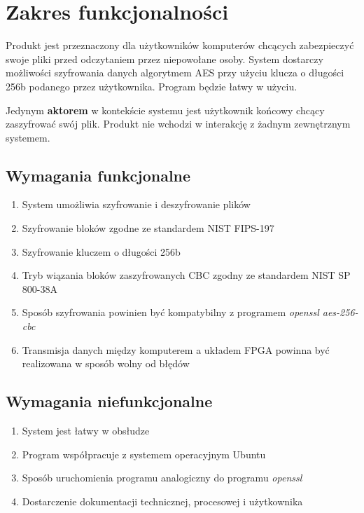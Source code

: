 \section{Zakres funkcjonalności}
\label{sec:zakres-funkcjonalnosci}

Produkt jest przeznaczony dla użytkowników komputerów chcących zabezpieczyć swoje pliki przed odczytaniem przez niepowołane osoby. System dostarczy możliwości szyfrowania danych algorytmem AES przy użyciu klucza o długości 256b podanego przez użytkownika. Program będzie łatwy w użyciu.

Jedynym \textbf{aktorem} w kontekście systemu jest użytkownik końcowy chcący zaszyfrować swój plik. Produkt nie wchodzi w interakcję z żadnym zewnętrznym systemem.

\subsection{Wymagania funkcjonalne}
\begin{enumerate}
\item System umożliwia szyfrowanie i deszyfrowanie plików
\item Szyfrowanie bloków zgodne ze standardem NIST FIPS-197 \cite{aes-standard}
\item Szyfrowanie kluczem o długości 256b
\item Tryb wiązania bloków zaszyfrowanych CBC zgodny ze standardem NIST SP 800-38A \cite{cbc-standard}
\item Sposób szyfrowania powinien być kompatybilny z programem \textit{openssl aes-256-cbc} 
\item Transmisja danych między komputerem a układem FPGA powinna być realizowana w sposób wolny od błędów
\end{enumerate}

\subsection{Wymagania niefunkcjonalne}
\begin{enumerate}
\item System jest łatwy w obsłudze
\item Program współpracuje z systemem operacyjnym Ubuntu
\item Sposób uruchomienia programu analogiczny do programu \textit{openssl}
\item Dostarczenie dokumentacji technicznej, procesowej i użytkownika

\end{enumerate}



\newpage
